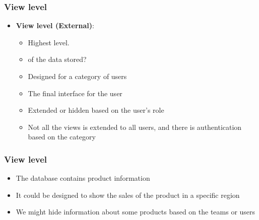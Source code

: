 \VideoClassification
\begin{frame}
    \frametitle{View level}
    \begin{itemize}[<+->]
        \item \textbf{View level (External)}:
        \begin{itemize}[<+->]
            \item Highest level.
            \item \textbf{\underline{}} of the data stored?
            \item Designed for a category of users
            \item The final interface for the user
            \item Extended or hidden based on the user's role
            \item Not all the views is extended to all users, and there is authentication based on the category
        \end{itemize}
    \end{itemize}

\end{frame}
\begin{frame}
    \frametitle{View level}
    \begin{example}
        \begin{itemize}[<+->]
            \item The database contains product information
            \item It could be designed to show the sales of the product in a specific region
            \item We might hide information about some products based on the teams or users
        \end{itemize}
    \end{example}

\end{frame}

